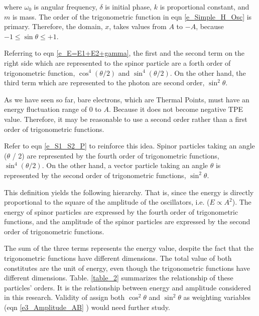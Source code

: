 \documentclass[%
 reprint,
 amsmath,amssymb,
 aps,
]{revtex4-1}
\numberwithin{equation}{section}%
\begin{document}
    \noindent
    where $\omega_{\mathrm{0}}$ is angular frequency, $\delta$ is initial phase, $k$ is proportional constant, and $m$ is mass. The order of the trigonometric function in eqn \ref{e_Simple_H_Osc} is primary. Therefore, the domain, $x$, takes values from $A$ to $-A$, because $ -1 \leq \sin \theta \leq +1$.

    Referring to eqn \ref{e_E=E1+E2+gamma}, the first and the second term on the right side which are represented to the spinor particle are a forth order of trigonometric function, $\cos^{4} (\theta / 2)$ and $\sin^{4} (\theta / 2)$. On the other hand, the third term which are represented to the photon are second order, $\sin^{2} \theta$.

    As we have seen so far, bare electrons, which are Thermal Points, must have an energy fluctuation range of 0 to $A$. Because it does not become negative TPE value. Therefore, it may be reasonable to use a second order rather than a first order of trigonometric functions.
    
    Refer to eqn \ref{e_S1_S2_P} to reinforce this idea. Spinor particles taking an angle ($\theta$ / 2) are represented by the fourth order of trigonometric functions, $\sin^{4} (\theta / 2)$. On the other hand, a vector particle taking an angle $\theta$ is represented by the second order of trigonometric functions, $\sin^{2} \theta$.

    This definition yields the following hierarchy. That is, since the energy is directly proportional to the square of the amplitude of the oscillators, i.e. ($E \propto A^{2}$). The energy of spinor particles are expressed by the fourth order of trigonometric functions, and the amplitude of the spinor particles are expressed by the second order of trigonometric functions.
    
    The sum of the three terms represents the energy value, despite the fact that the trigonometric functions have different dimensions. The total value of both constitutes are the unit of energy, even though the trigonometric functions have different dimensions. Table. \ref{table_2} summarizes the relationship of these particles' orders. It is the relationship between energy and amplitude considered in this research. Validity of assign both $\cos^{2} \theta$ and $\sin^{2} \theta$ as weighting variables (eqn \ref{e3_Amplitude_AB} ) would need further study.


\end{document}

